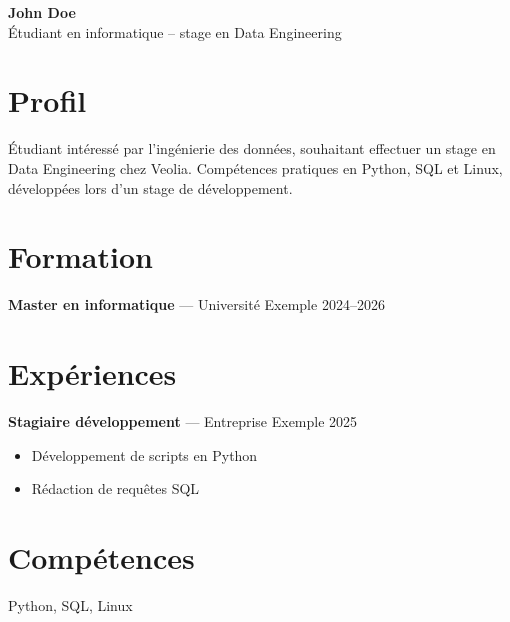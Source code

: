 \documentclass[11pt,a4paper]{article}
\begin{document}
\begin{center}
{\LARGE\bfseries John Doe }\\[3pt]
Étudiant en informatique – stage en Data Engineering
\end{center}

\section*{Profil}
Étudiant intéressé par l'ingénierie des données, souhaitant effectuer un stage en Data Engineering chez Veolia. Compétences pratiques en Python, SQL et Linux, développées lors d'un stage de développement.

\section*{Formation}

\textbf{Master en informatique} --- Université Exemple \hfill 2024–2026\par


\section*{Expériences}

\textbf{Stagiaire développement} --- Entreprise Exemple \hfill 2025\par
\begin{itemize}

\item Développement de scripts en Python

\item Rédaction de requêtes SQL

\end{itemize}


\section*{Compétences}
Python, SQL, Linux
\end{document}
